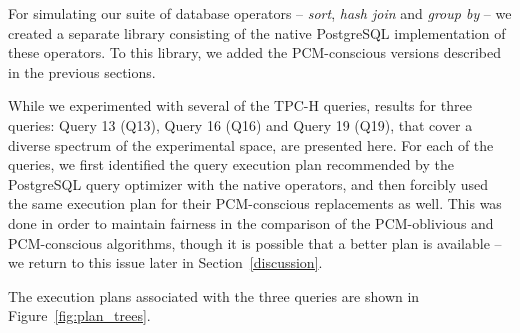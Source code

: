 For simulating our suite of database operators -- \textit{sort},
\textit{hash join} and \textit{group by} -- we created a separate library
consisting of the native PostgreSQL implementation of these operators. To
this library, we added the PCM-conscious versions described in the
previous sections.

While we experimented with several of the TPC-H queries, results for
three queries: Query 13 (Q13), Query 16 (Q16) and Query 19 (Q19), that
cover a diverse spectrum of the experimental space, are presented here.
For each of the queries, we first identified the query execution plan
recommended by the PostgreSQL query optimizer with the native operators,
and then forcibly used the same execution plan for their PCM-conscious
replacements as well. This was done in order to maintain fairness in the
comparison of the PCM-oblivious and PCM-conscious algorithms, though it
is possible that a better plan is available -- we return to this issue 
later in Section~\ref{discussion}. 

The execution plans associated with the three queries are shown in Figure~\ref{fig:plan_trees}. 
 


